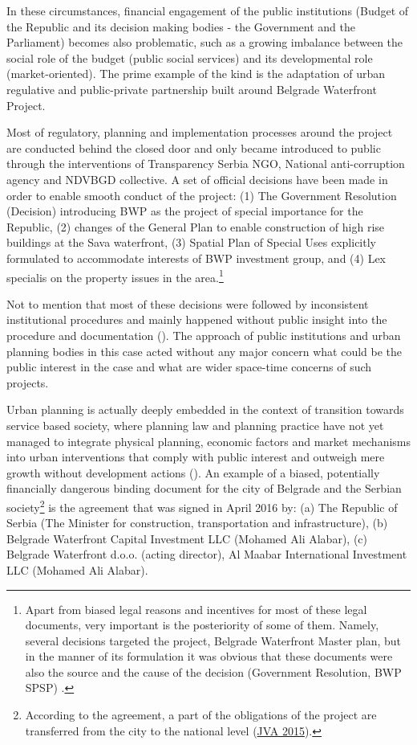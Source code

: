 \documentclass[11pt]{report}
\begin{document}
In these circumstances, financial engagement of the public institutions (Budget of the Republic and its decision making bodies - the Government and the Parliament) becomes also problematic, such as a growing imbalance between the social role of the budget (public social services) and its developmental role (market-oriented).
The prime example of the kind is the adaptation of urban regulative and public-private partnership built around Belgrade Waterfront Project.

Most of regulatory, planning and implementation processes around the project are conducted behind the closed door and only became introduced to public through the interventions of Transparency Serbia NGO, National anti-corruption agency and NDVBGD collective.
A set of official decisions have been made in order to enable smooth conduct of the project:
(1) The Government Resolution (Decision) introducing BWP as the project of special importance for the Republic,
(2) changes of the General Plan to enable construction of high rise buildings at the Sava waterfront,
(3) Spatial Plan of Special Uses explicitly formulated to accommodate interests of BWP investment group,
and
(4) Lex specialis on the property issues in the area.\footnote{Apart from biased legal reasons and incentives for most of these legal documents, very important is the posteriority of some of them. Namely, several decisions targeted the project, Belgrade Waterfront Master plan, but in the manner of its formulation it was obvious that these documents were also the source and the cause of the decision (Government Resolution, BWP SPSP) \cite{Alternativni izvestaj}.}

Not to mention that most of these decisions were followed by inconsistent institutional procedures and mainly happened without public insight into the procedure and documentation (\cite{alternativni izvestaj}).
The approach of public institutions and urban planning bodies in this case acted without any major concern what could be the public interest in the case and what are wider space-time concerns of such projects.

Urban planning is actually deeply embedded in the context of transition towards service based society, where planning law and planning practice have not yet managed to integrate physical planning, economic factors and market mechanisms into urban interventions that comply with public interest and outweigh mere growth without development actions (\href{ref}{\citealt{vujosevic_collapse_2010}}).
An example of a biased, potentially financially dangerous binding document for the city of Belgrade and the Serbian society\footnote{
According to the agreement, a part of the obligations of the project are transferred from the city to the national level (\href{ref}{JVA 2015}).}
is the agreement that was signed in April 2016 by:
(a) The Republic of Serbia (The Minister for construction, transportation and infrastructure),
(b) Belgrade Waterfront Capital Investment LLC (Mohamed Ali Alabar),
(c) Belgrade Waterfront d.o.o. (acting director),
Al Maabar International Investment LLC (Mohamed Ali Alabar).
\end{document}
